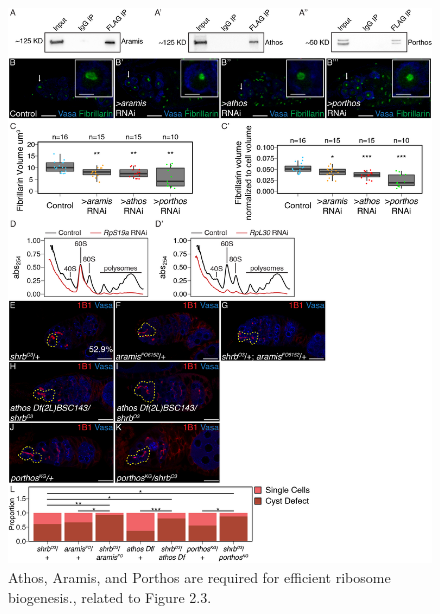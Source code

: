 \documentclass[12pt,oneside]{reedthesis}
\begin{document}
\begin{figure}

{\centering \includegraphics[width=6.5 in,height=8.9375 in]{./figure/Ribosome Biogenesis/Ribosome Biogenesis 2S} 

}

\caption[Athos, Aramis, and Porthos are required for efficient ribosome biogenesis., related to Figure 2.3.]{Athos, Aramis, and Porthos are required for efficient ribosome biogenesis., related to Figure 2.3.}\label{fig:unnamed-chunk-9}
\end{figure}
\end{document}
